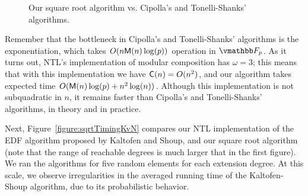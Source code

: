 \begin{figure}[ht]
\setlength{\abovecaptionskip}{0cm}
\begin{flushleft}
\end{flushleft}
\caption{\small Our square root algorithm vs. Cipolla's and
  Tonelli-Shanks' algorithms.}
\label{figure:sqrtTiming}
\end{figure}

Remember that the bottleneck in Cipolla's and Tonelli-Shanks'
algorithms is the exponentiation, which takes $O(n\mathsf{M}(n)\log(p))$
operation in $\F_p$. As it turns out, NTL's implementation of modular
composition has $\omega=3$; this means that with this implementation
we have $\mathsf{C}(n)=O(n^2)$, and our algorithm takes expected time
$O(\mathsf{M}(n)\log(p)+n^2 \log(n))$. Although this implementation is not
subquadratic in $n$, it remains faster than Cipolla's and
Tonelli-Shanks' algorithms, in theory and in practice.

\medskip

Next, Figure~\ref{figure:sqrtTimingKvN} compares our NTL
implementation of the EDF algorithm proposed by Kaltofen and Shoup,
and our square root algorithm (note that the range of reachable
degrees is much larger that in the first figure). We ran the
algorithms for five random elements for each extension degree.  At
this scale, we observe irregularities in the averaged running time of
the Kaltofen-Shoup algorithm, due to its probabilistic behavior.

